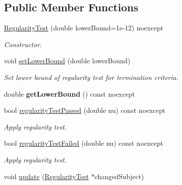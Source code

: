 \subsection*{Public Member Functions}
\begin{DoxyCompactItemize}
\item 
\hyperlink{classSpacy_1_1Mixin_1_1RegularityTest_a89c4ffe9b8891c1f81d57e84141a2ef6}{Regularity\+Test} (double lower\+Bound=1e-\/12) noexcept
\begin{DoxyCompactList}\small\item\em Constructor. \end{DoxyCompactList}\item 
void \hyperlink{classSpacy_1_1Mixin_1_1RegularityTest_a29ae1c15b8447601c2a783352e01bde2}{set\+Lower\+Bound} (double lower\+Bound)\hypertarget{classSpacy_1_1Mixin_1_1RegularityTest_a29ae1c15b8447601c2a783352e01bde2}{}\label{classSpacy_1_1Mixin_1_1RegularityTest_a29ae1c15b8447601c2a783352e01bde2}

\begin{DoxyCompactList}\small\item\em Set lower bound of regularity test for termination criteria. \end{DoxyCompactList}\item 
double {\bfseries get\+Lower\+Bound} () const noexcept\hypertarget{classSpacy_1_1Mixin_1_1RegularityTest_abc194f9b2150b6f02622867f673df4df}{}\label{classSpacy_1_1Mixin_1_1RegularityTest_abc194f9b2150b6f02622867f673df4df}

\item 
bool \hyperlink{classSpacy_1_1Mixin_1_1RegularityTest_a606383e629ebc0e84dc1cb6796aeeae1}{regularity\+Test\+Passed} (double nu) const noexcept
\begin{DoxyCompactList}\small\item\em Apply regularity test. \end{DoxyCompactList}\item 
bool \hyperlink{classSpacy_1_1Mixin_1_1RegularityTest_ac16e5fb18f3b591da58e32b821345f3d}{regularity\+Test\+Failed} (double nu) const noexcept
\begin{DoxyCompactList}\small\item\em Apply regularity test. \end{DoxyCompactList}\item 
void \hyperlink{classSpacy_1_1Mixin_1_1RegularityTest_a1a6191e20f84025cec8b10ec63ab94ac}{update} (\hyperlink{classSpacy_1_1Mixin_1_1RegularityTest}{Regularity\+Test} $\ast$changed\+Subject)\hypertarget{classSpacy_1_1Mixin_1_1RegularityTest_a1a6191e20f84025cec8b10ec63ab94ac}{}\label{classSpacy_1_1Mixin_1_1RegularityTest_a1a6191e20f84025cec8b10ec63ab94ac}


\end{DoxyCompactItemize}
